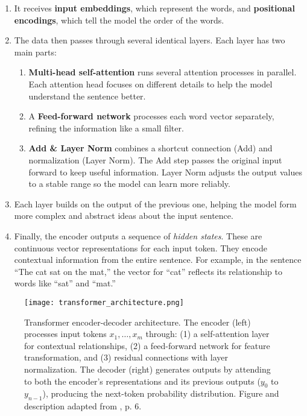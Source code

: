     \begin{enumerate}
        \item It receives \textbf{input embeddings}, which represent the words, and \textbf{positional encodings}, which tell the model the order of the words.
        
        \item The data then passes through several identical layers. Each layer has two main parts:
        \begin{enumerate}[label=\alph*.]
            \item \textbf{Multi-head self-attention} runs several attention processes in parallel. Each attention head focuses on different details to help the model understand the sentence better.
            \item A \textbf{Feed-forward network} processes each word vector separately, refining the information like a small filter.
            \item \textbf{Add \& Layer Norm} combines a shortcut connection (Add) and normalization (Layer Norm). The Add step passes the original input forward to keep useful information. Layer Norm adjusts the output values to a stable range so the model can learn more reliably.
    \end{enumerate}
    
    \item Each layer builds on the output of the previous one, helping the model form more complex and abstract ideas about the input sentence.
    
    \item Finally, the encoder outputs a sequence of \textit{hidden states}. These are continuous vector representations for each input token. They encode contextual information from the entire sentence. For example, in the sentence ``The cat sat on the mat,'' the vector for ``cat'' reflects its relationship to words like ``sat'' and ``mat.''
\end{enumerate}


\begin{figure}[ht]
    \centering
	\texttt{[image: transformer\_architecture.png]}	
    \caption{Transformer encoder-decoder architecture. The encoder (left) processes input tokens \(x_1,\dots,x_m\) through: (1) a self-attention layer for contextual relationships, (2) a feed-forward network for feature transformation, and (3) residual connections with layer normalization. The decoder (right) generates outputs by attending to both the encoder's representations and its previous outputs ($y_0$ to $y_{n-1}$), producing the next-token probability distribution. Figure and description adapted from \citet{xiaoIntroductionTransformersNLP2023}, p. 6.}
    \label{fig:transformer_architecture}
\end{figure}

